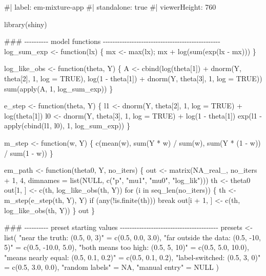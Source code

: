 \documentclass[
  letterpaper,
  DIV=11,
  numbers=noendperiod]{scrreprt}
\newenvironment{Shaded}{\begin{snugshade}}{\end{snugshade}}
\newcommand{\NormalTok}[1]{\textcolor[rgb]{0.00,0.23,0.31}{#1}}
\begin{document}
\begin{Shaded}
\begin{Highlighting}[]
\NormalTok{\#| label: em{-}mixture{-}app}
\NormalTok{\#| standalone: true}
\NormalTok{\#| viewerHeight: 760}

\NormalTok{library(shiny)}

\NormalTok{\#\#\# {-}{-}{-}{-}{-}{-}{-}{-}{-}{-} model functions {-}{-}{-}{-}{-}{-}{-}{-}{-}{-}{-}{-}{-}{-}{-}{-}{-}{-}{-}{-}{-}{-}{-}{-}{-}{-}{-}{-}{-}{-}{-}{-}{-}{-}{-}{-}{-}{-}{-}{-}{-}{-}{-}{-}{-}{-}{-}{-}{-}}
\NormalTok{log\_sum\_exp \textless{}{-} function(lx) \{ mx \textless{}{-} max(lx); mx + log(sum(exp(lx {-} mx))) \}}

\NormalTok{log\_like\_obs \textless{}{-} function(theta, Y) \{}
\NormalTok{    A \textless{}{-} cbind(log(theta[1])     + dnorm(Y, theta[2], 1, log = TRUE),}
\NormalTok{               log(1 {-} theta[1]) + dnorm(Y, theta[3], 1, log = TRUE))}
\NormalTok{    sum(apply(A, 1, log\_sum\_exp))}
\NormalTok{\}}

\NormalTok{e\_step \textless{}{-} function(theta, Y) \{}
\NormalTok{    l1 \textless{}{-} dnorm(Y, theta[2], 1, log = TRUE) + log(theta[1])}
\NormalTok{    l0 \textless{}{-} dnorm(Y, theta[3], 1, log = TRUE) + log(1 {-} theta[1])}
\NormalTok{    exp(l1 {-} apply(cbind(l1, l0), 1, log\_sum\_exp))}
\NormalTok{\}}

\NormalTok{m\_step \textless{}{-} function(w, Y) \{}
\NormalTok{    c(mean(w), sum(Y * w) / sum(w), sum(Y * (1 {-} w)) / sum(1 {-} w))}
\NormalTok{\}}

\NormalTok{em\_path \textless{}{-} function(theta0, Y, no\_iters) \{}
\NormalTok{    out \textless{}{-} matrix(NA\_real\_, no\_iters + 1, 4,}
\NormalTok{                  dimnames = list(NULL, c("p", "mu1", "mu0", "log\_lik")))}
\NormalTok{    th \textless{}{-} theta0}
\NormalTok{    out[1, ] \textless{}{-} c(th, log\_like\_obs(th, Y))}
\NormalTok{    for (i in seq\_len(no\_iters)) \{}
\NormalTok{        th \textless{}{-} m\_step(e\_step(th, Y), Y)}
\NormalTok{        if (any(!is.finite(th))) break}
\NormalTok{        out[i + 1, ] \textless{}{-} c(th, log\_like\_obs(th, Y))}
\NormalTok{    \}}
\NormalTok{    out}
\NormalTok{\}}

\NormalTok{\#\#\# {-}{-}{-}{-}{-}{-}{-}{-}{-}{-} preset starting values {-}{-}{-}{-}{-}{-}{-}{-}{-}{-}{-}{-}{-}{-}{-}{-}{-}{-}{-}{-}{-}{-}{-}{-}{-}{-}{-}{-}{-}{-}{-}{-}{-}{-}{-}{-}{-}{-}{-}{-}{-}}
\NormalTok{presets \textless{}{-} list(}
\NormalTok{    "near the truth: (0.5, 0, 3)"                 = c(0.5,  0.0,  3.0),}
\NormalTok{    "far outside the data: (0.5, {-}10, 5)"         = c(0.5, {-}10.0, 5.0),}
\NormalTok{    "both means too high: (0.5, 5, 10)"           = c(0.5,  5.0, 10.0),}
\NormalTok{    "means nearly equal: (0.5, 0.1, 0.2)"         = c(0.5,  0.1,  0.2),}
\NormalTok{    "label{-}switched: (0.5, 3, 0)"                 = c(0.5,  3.0,  0.0),}
\NormalTok{    "random labels"                               = NA,}
\NormalTok{    "manual entry"                                = NULL}
\NormalTok{)}


\end{Highlighting}
\end{Shaded}
\end{document}
